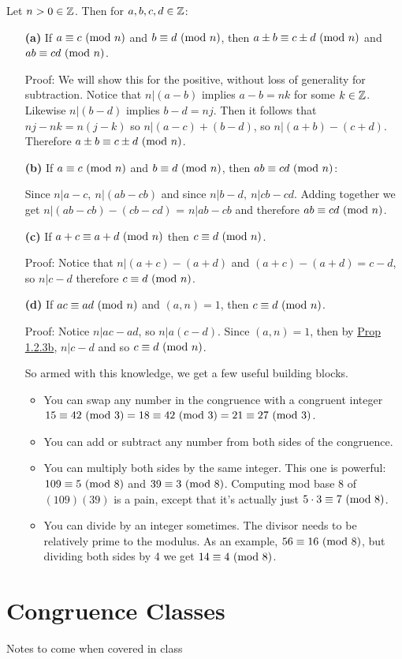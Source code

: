  Let \(n > 0 \in \mathbb{Z}\). Then for \(a,b,c,d \in \mathbb{Z}\):
\begin{itemize}
    \item[\textbf{(a)}] If \({a}\equiv{c}\text{ (mod } {n}\text{)}\) and \({b}\equiv{d}\text{ (mod } {n}\text{)}\), then \({a \pm b}\equiv{c \pm d}\text{ (mod } {n}\text{)}\) and \({ab}\equiv{cd}\text{ (mod } {n}\text{)}\).

          Proof: We will show this for the positive, without loss of generality for subtraction. Notice that \(n|(a-b)\) implies \(a-b = nk\) for some \(k \in \mathbb{Z}\). Likewise \(n|(b-d)\) implies \(b-d = nj\). Then it follows that \(nj - nk = n(j-k)\) so \(n | (a-c) + (b-d)\), so \(n| (a+b) - (c+d)\). Therefore \({a \pm b}\equiv{c \pm d}\text{ (mod } {n}\text{)}\).

    \item[\textbf{(b)}] If \({a}\equiv{c}\text{ (mod } {n}\text{)}\) and \({b}\equiv{d}\text{ (mod } {n}\text{)}\), then \({ab}\equiv{cd}\text{ (mod } {n}\text{)}\):

          Since \(n|a-c,\ n|(ab - cb)\) and since \(n|b-d,\ n|cb-cd\). Adding together we get \(n|(ab-cb) - (cb-cd)\) = \(n|ab-cb\) and therefore \({ab}\equiv{cd}\text{ (mod } {n}\text{)}\).
    \item[\textbf{(c)}] If \({a+c}\equiv{a+d}\text{ (mod } {n}\text{)}\) then \({c}\equiv{d}\text{ (mod } {n}\text{)}\).

          Proof: Notice that \(n | (a+c) - (a+d)\) and \((a+c) - (a+d) = c - d\), so \(n | c -d\) therefore \({c}\equiv{d}\text{ (mod } {n}\text{)}\).
    \item[\textbf{(d)}] If \({ac}\equiv{ad}\text{ (mod } {n}\text{)}\) and \((a,n) = 1\), then \({c}\equiv{d}\text{ (mod } {n}\text{)}\).

          Proof: Notice \(n | ac - ad\), so \(n|a(c-d)\). Since \((a, n) = 1\), then by \hyperref[def:1.2.3]{Prop 1.2.3b}, \(n| c-d\) and so \({c}\equiv{d}\text{ (mod } {n}\text{)}\).

          So armed with this knowledge, we get a few useful building blocks.
          \begin{itemize}

              \item You can swap any number in the congruence with a congruent integer \({15}\equiv{42}\text{ (mod } {3}\text{)} = {18}\equiv{42}\text{ (mod } {3}\text{)} = {21}\equiv{27}\text{ (mod } {3}\text{)}\).
              \item You can add or subtract any number from both sides of the congruence.
              \item You can multiply both sides by the same integer. This one is powerful: \({109}\equiv{5}\text{ (mod } {8}\text{)}\) and \({39}\equiv{3}\text{ (mod } {8}\text{)}\). Computing mod base 8 of \((109)(39)\) is a pain, except that it's actually just \({5 \cdot 3}\equiv{7}\text{ (mod } {8}\text{)}\).
              \item You can divide by an integer sometimes. The divisor needs to be relatively prime to the modulus. As an example, \({56}\equiv{16}\text{ (mod } {8}\text{)}\), but dividing both sides by 4 we get \({14}\equiv{4}\text{ (mod } {8}\text{)}\).
          \end{itemize}
\end{itemize}

\section{Congruence Classes}

Notes to come when covered in class